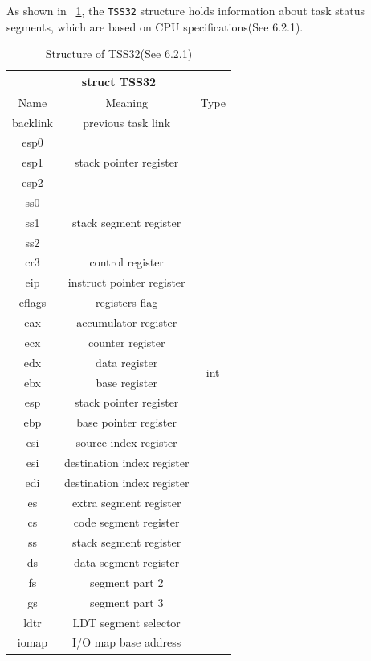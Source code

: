 \documentclass{swfcthesis}
\begin{document}
As shown in ~\ref{tab:TSS32}, the \texttt{TSS32} structure holds information about task
status segments, which are based on CPU specifications(See 6.2.1\cite{intel_3a}).
\begin{table}[!htbp]
  \centering
  \begin{tabular}{|c|c|c|}
    \hline
    \multicolumn{3}{|c|}{struct TSS32} \\
    \hline
    Name & Meaning & Type \\
    \hline
    backlink & previous task link & \multirow{26}{*}{int} \\
    \cline{1-2}
    esp0 & \multirow{3}{*}{stack pointer register} & \\
    esp1 & & \\
    esp2 & & \\
    \cline{1-2}
    ss0 & \multirow{3}{*}{stack segment register} & \\
    ss1 & & \\
    ss2 & & \\
    \cline{1-2}
    cr3 & control register & \\
    \cline{1-2}
    eip & instruct pointer register & \\
    \cline{1-2}
    eflags & registers flag & \\
    \cline{1-2}
    eax & accumulator register & \\
    \cline{1-2}
    ecx & counter register & \\
    \cline{1-2}
    edx & data register & \\
    \cline{1-2}
    ebx & base register & \\
    \cline{1-2}
    esp & stack pointer register & \\
    \cline{1-2}
    ebp & base pointer register & \\
    \cline{1-2}
    esi & source index register & \\
    \cline{1-2}
    esi & destination index register & \\
    \cline{1-2}
    edi & destination index register & \\
    \cline{1-2}
    es & extra segment register & \\
    \cline{1-2}
    cs & code segment register & \\
    \cline{1-2}
    ss & stack segment register & \\
    \cline{1-2}
    ds & data segment register & \\
    \cline{1-2}
    fs & segment part 2 & \\
    \cline{1-2}
    gs & segment part 3 & \\
    \cline{1-2}
    ldtr & LDT segment selector & \\
    \cline{1-2}
    iomap & I/O map base address & \\
    \hline
    
  \end{tabular}
  \caption{Structure of TSS32(See 6.2.1\cite{intel_3a})}
  \label{tab:TSS32}
\end{table}
\end{document}
